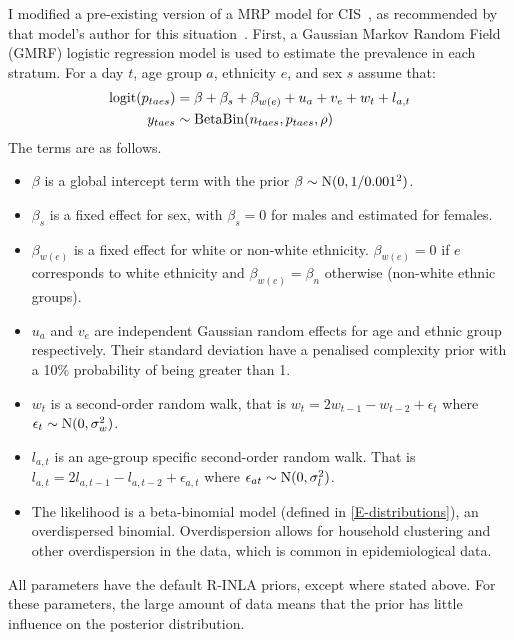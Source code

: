 \documentclass[thesis.tex]{subfiles}
\begin{document}
I modified a pre-existing version of a MRP model for CIS~\autocite{pouwelsMRPvaccination}, as recommended by that model's author for this situation~.
First, a Gaussian Markov Random Field (GMRF) logistic regression model is used to estimate the prevalence in each stratum.
For a day $t$, age group $a$, ethnicity $e$, and sex $s$ assume that:
\begin{align}
    \operatorname{logit}(p_{taes}) &= \beta + \beta_s + \beta_{w(e)} + u_a + v_e + w_t + l_{a,t} \\
    y_{taes} &\sim \operatorname{BetaBin}(n_{taes}, p_{taes}, \rho)
\end{align}
The terms are as follows.
\begin{itemize}
    \item $\beta$ is a global intercept term with the prior $\beta \sim \operatorname{N}(0, 1/0.001^2)$.
    \item $\beta_s$ is a fixed effect for sex, with $\beta_s = 0$ for males and estimated for females.
    \item $\beta_{w(e)}$ is a fixed effect for white or non-white ethnicity. $\beta_{w(e)} = 0$ if $e$ corresponds to white ethnicity and $\beta_{w(e)} = \beta_{n}$ otherwise (\ie non-white ethnic groups).%
    \item $u_a$ and $v_e$ are independent Gaussian random effects for age and ethnic group respectively. Their standard deviation have a penalised complexity prior with a 10\% probability of being greater than 1.
    \item $w_t$ is a second-order random walk, that is $w_t = 2w_{t-1} - w_{t-2} + \epsilon_t$ where $\epsilon_t \sim \operatorname{N}(0, \sigma_w^2)$.
    \item $l_{a,t}$ is an age-group specific second-order random walk. That is $l_{a,t} = 2l_{a,t-1} - l_{a,t-2} + \epsilon_{a,t}$ where $\epsilon_{at} \sim \operatorname{N}(0, \sigma_l^2)$.
    \item The likelihood is a beta-binomial model (defined in \cref{E-distributions}), an overdispersed binomial. Overdispersion allows for household clustering and other overdispersion in the data, which is common in epidemiological data. 
\end{itemize}
All parameters have the default R-INLA priors, except where stated above.
For these parameters, the large amount of data means that the prior has little influence on the posterior distribution.
\end{document}
